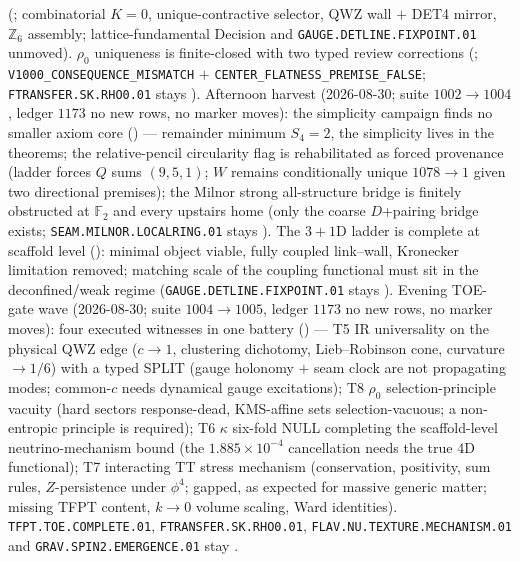 \begin{keybox}
(;
combinatorial $K=0$, unique-contractive selector, QWZ wall $+$ DET4 mirror, $\mathbb Z_6$
assembly; lattice-fundamental Decision and \texttt{GAUGE.DETLINE.FIXPOINT.01} unmoved).
$\rho_0$ uniqueness is finite-closed with two typed review corrections
(;
\texttt{V1000\_CONSEQUENCE\_MISMATCH} $+$ \texttt{CENTER\_FLATNESS\_PREMISE\_FALSE};
\texttt{FTRANSFER.SK.RHO0.01} stays \mO).
Afternoon harvest (2026-08-30; suite $1002\to1004$, ledger $1173$ no new rows, no marker moves):
the simplicity campaign finds no smaller axiom core
() ---
remainder minimum $S_4=2$, the simplicity lives in the theorems; the relative-pencil
circularity flag is rehabilitated as forced provenance (ladder forces $Q$ sums $(9,5,1)$;
$W$ remains conditionally unique $1078\to1$ given two directional premises);
the Milnor strong all-structure bridge is finitely obstructed at $\mathbb F_2$ and every
upstairs home (only the coarse $D$+pairing bridge exists;
\texttt{SEAM.MILNOR.LOCALRING.01} stays \mO).
The $3{+}1$D ladder is complete at scaffold level
():
minimal object viable, fully coupled link--wall, Kronecker limitation removed;
matching scale of the coupling functional must sit in the deconfined/weak regime
(\texttt{GAUGE.DETLINE.FIXPOINT.01} stays \mO).
Evening TOE-gate wave (2026-08-30; suite $1004\to1005$, ledger $1173$ no new rows, no marker moves):
four executed witnesses in one battery
() ---
T5 IR universality on the physical QWZ edge ($c\to1$, clustering dichotomy, Lieb--Robinson cone, curvature $\to1/6$) with a typed SPLIT (gauge holonomy $+$ seam clock are not propagating modes; common-$c$ needs dynamical gauge excitations);
T8 $\rho_0$ selection-principle vacuity (hard sectors response-dead, KMS-affine sets selection-vacuous; a non-entropic principle is required);
T6 $\kappa$ six-fold NULL completing the scaffold-level neutrino-mechanism bound (the $1.885{\times}10^{-4}$ cancellation needs the true $4$D functional);
T7 interacting TT stress mechanism (conservation, positivity, sum rules, $Z$-persistence under $\phi^4$; gapped, as expected for massive generic matter; missing TFPT content, $k\to0$ volume scaling, Ward identities).
\texttt{TFPT.TOE.COMPLETE.01}, \texttt{FTRANSFER.SK.RHO0.01},
\texttt{FLAV.NU.TEXTURE.MECHANISM.01} and \texttt{GRAV.SPIN2.EMERGENCE.01} stay \mO.

\end{keybox}
